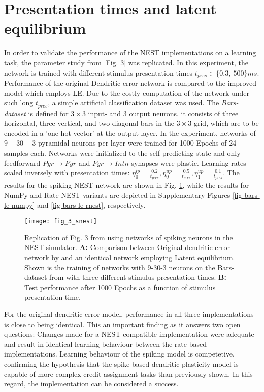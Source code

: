 \section{Presentation times and latent equilibrium}\label{sec-le-tpres}

In order to validate the performance of the NEST implementations on a learning task, the parameter study from
\citep{Haider2021}[Fig. 3] was replicated. In this experiment, the network is trained with different stimulus
presentation times $t_{pres} \in \{0.3,\ 500\}ms$. Performance of the original Dendritic error network is compared to
the improved model which employs LE. Due to the costly computation of the network under such long $t_{pres}$, a simple
artificial classification dataset was used. The \textit{Bars-dataset} is defined for $3\times3$ input- and $3$ output
neurons. it consists of three horizontal, three vertical, and two diagonal bars in the $3\times3$ grid, which are to be
encoded in a 'one-hot-vector' at the output layer. In the experiment, networks of $9-30-3$ pyramidal neurons per layer
were trained for 1000 Epochs of 24 samples each. Networks were initialized to the self-predicting state and only
feedforward $Pyr\rightarrow Pyr$ and $Pyr \rightarrow Intn$ synapses were plastic. Learning rates scaled inversely with
presentation times: $\eta^{ip}_0 = \frac{0.2}{t_{pres}}, \eta^{up}_0 = \frac{0.5}{t_{pres}}, \eta^{up}_1 =
\frac{0.1}{t_{pres}}$. The results for the spiking NEST network are shown in Fig. \ref{fig-bars-le-snest}, while the
results for NumPy and Rate NEST variants are depicted in Supplementary Figures \ref{fig-bars-le-numpy} and
\ref{fig-bars-le-rnest}, respectively.


\begin{figure}[h]
    \centering
    \texttt{[image: fig\_3\_snest]}
    \caption{Replication of Fig. 3 from \cite{Haider2021} using networks of spiking neurons in the NEST simulator.
        \textbf{A:} Comparison between Original dendritic error network by and an identical network employing Latent
        equilibrium. Shown is the training of networks with 9-30-3 neurons on the Bars-dataset from with three different
        stimulus presentation times. \textbf{B:} Test performance after 1000 Epochs as a function of stimulus
        presentation time.}
    \label{fig-bars-le-snest}
\end{figure}

For the original dendritic error model, performance in all three implementations is close to being identical. This an
important finding as it answers two open questions: Changes made for a NEST-compatible implementation were adequate and
result in identical learning behaviour between the rate-based implementations. Learning behaviour of the spiking model
is competetive, confirming the hypothesis that the spike-based dendritic plasticity model is capable of more complex
credit assignment tasks than previously shown. In this regard, the implementation can be considered a success.

